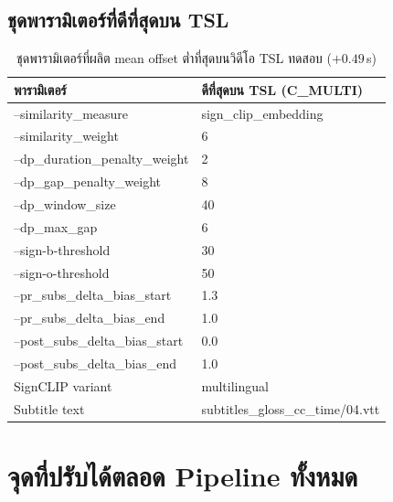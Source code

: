 \documentclass[11pt,a4paper]{article}
\def\texttt#1{#1}%
\def\textbf#1{#1}%
\begin{document}
\subsection{ชุดพารามิเตอร์ที่ดีที่สุดบน TSL}
\begin{table}[h]
\centering
\small
\begin{tabularx}{\linewidth}{lX}
\toprule
\textbf{พารามิเตอร์} & \textbf{ดีที่สุดบน TSL (C\_MULTI)} \\
\midrule
\texttt{--similarity\_measure}              & \texttt{sign\_clip\_embedding} \\
\texttt{--similarity\_weight}               & 6 \\
\texttt{--dp\_duration\_penalty\_weight}    & 2 \\
\texttt{--dp\_gap\_penalty\_weight}         & 8 \\
\texttt{--dp\_window\_size}                 & 40 \\
\texttt{--dp\_max\_gap}                     & 6 \\
\texttt{--sign-b-threshold}                 & 30 \\
\texttt{--sign-o-threshold}                 & 50 \\
\texttt{--pr\_subs\_delta\_bias\_start}     & 1.3 \\
\texttt{--pr\_subs\_delta\_bias\_end}       & 1.0 \\
\texttt{--post\_subs\_delta\_bias\_start}   & 0.0 \\
\texttt{--post\_subs\_delta\_bias\_end}     & 1.0 \\
SignCLIP variant                            & \texttt{multilingual} \\
Subtitle text                               & \texttt{subtitles\_gloss\_cc\_time/04.vtt} \\
\bottomrule
\end{tabularx}
\caption{ชุดพารามิเตอร์ที่ผลิต mean offset ต่ำที่สุดบนวิดีโอ TSL ทดสอบ ($+0.49$\,s)}
\label{tab:best-params}
\end{table}


\section{จุดที่ปรับได้ตลอด Pipeline ทั้งหมด}
\end{document}
